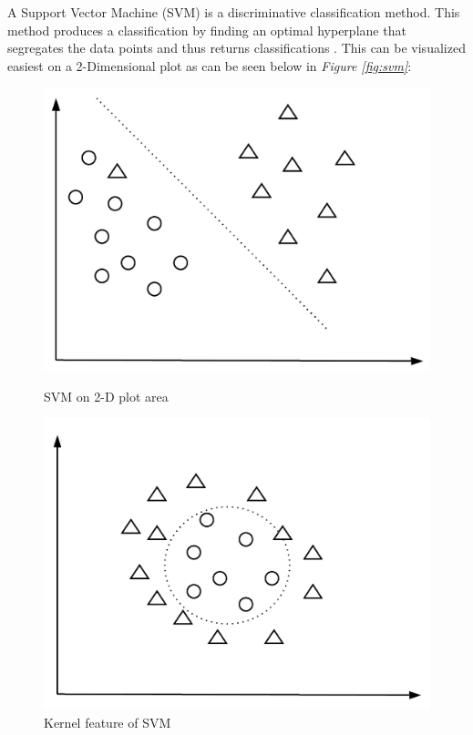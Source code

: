 \documentclass[11pt, a4paper]{article}
\begin{document}
A Support Vector Machine (SVM) is a discriminative classification method. This method produces a classification by finding an optimal hyperplane that segregates the data points and thus returns classifications \cite{svm}. This can be visualized easiest on a 2-Dimensional plot as can be seen below in \emph{Figure \ref{fig:svm}}:
\begin{figure}[h!]
\centering
\begin{minipage}[]{0.45\textwidth}
\includegraphics[scale=0.16]{svm}
\caption{SVM on 2-D plot area}
\label{fig:svm}
\end{minipage}
\hspace{0.5 cm}
\begin{minipage}[]{0.45\textwidth}
\includegraphics[scale=0.16]{svm_kernel}
\caption{Kernel feature of SVM}
\label{fig:svm_kernel}
\end{minipage}
\end{figure}
\end{document}

